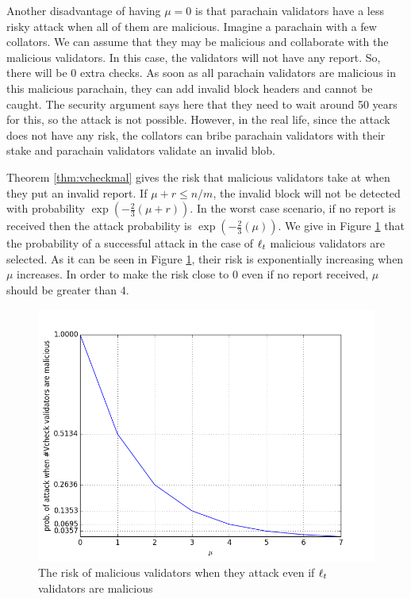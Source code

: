 Another disadvantage of having $\mu = 0$ is that parachain validators have a less risky attack  when all of them are malicious. Imagine a parachain with a few collators. We can assume that they may be malicious and collaborate with the malicious validators. In this case, the validators will not have any report. So, there will be 0 extra checks. As soon as all parachain validators are malicious in this malicious parachain, they can add invalid block headers and cannot be caught. The security argument says here that they need to wait around 50 years for this, so the attack is not possible. However, in the real life, since the attack does not have any risk, the collators can bribe parachain validators with their stake and parachain validators validate an invalid blob.


Theorem \ref{thm:vcheckmal} gives the risk that  malicious validators take at  when they put an invalid report.  If $\mu + r \leq n/m$, the invalid block will not be detected with probability $\exp(-\frac{2}{3}(\mu+r))$. In the worst case scenario, if no report is received then the attack probability is $\exp(-\frac{2}{3}(\mu))$. We give in Figure \ref{fig:mu} that the probability of a successful attack in the case of $\ell_t$ malicious validators are selected. As it can be seen in Figure \ref{fig:mu}, their risk is exponentially increasing when $\mu$ increases. In order to make the risk close to 0 even if no report received, $\mu$ should be greater than $4$.

\begin{figure}[h]\centering
	  \includegraphics[width=12cm]{images/muval.png}
	  \caption{The risk of malicious validators when they attack even if $\ell_t$ validators are malicious}
	  \label{fig:mu}
\end{figure}

